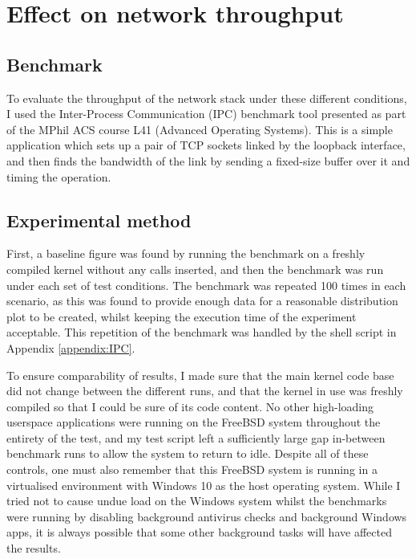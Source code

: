 \documentclass[a4paper,12pt,twoside,openright]{report}
\begin{document}
	\section{Effect on network throughput}
	\label{sec:IPC-expt}
	
	\subsection{Benchmark}
	
	To evaluate the throughput of the network stack under these different conditions, I used the Inter-Process Communication (IPC) benchmark tool presented as part of the MPhil ACS course L41 (Advanced Operating Systems)\cite{L41}. This is a simple application which sets up a pair of TCP sockets linked by the loopback interface, and then finds the bandwidth of the link by sending a fixed-size buffer over it and timing the operation.
	
	\subsection{Experimental method}
	
	First, a baseline figure was found by running the benchmark on a freshly compiled kernel without any calls inserted, and then the benchmark was run under each set of test conditions. The benchmark was repeated 100 times in each scenario, as this was found to provide enough data for a reasonable distribution plot to be created, whilst keeping the execution time of the experiment acceptable. This repetition of the benchmark was handled by the shell script in Appendix \ref{appendix:IPC}.
	
	To ensure comparability of results, I made sure that the main kernel code base did not change between the different runs, and that the kernel in use was freshly compiled so that I could be sure of its code content. No other high-loading userspace applications were running on the FreeBSD system throughout the entirety of the test, and my test script left a sufficiently large gap in-between benchmark runs to allow the system to return to idle. Despite all of these controls, one must also remember that this FreeBSD system is running in a virtualised environment with Windows 10 as the host operating system. While I tried not to cause undue load on the Windows system whilst the benchmarks were running by disabling background antivirus checks and background Windows apps, it is always possible that some other background tasks will have affected the results.
	
\end{document}
